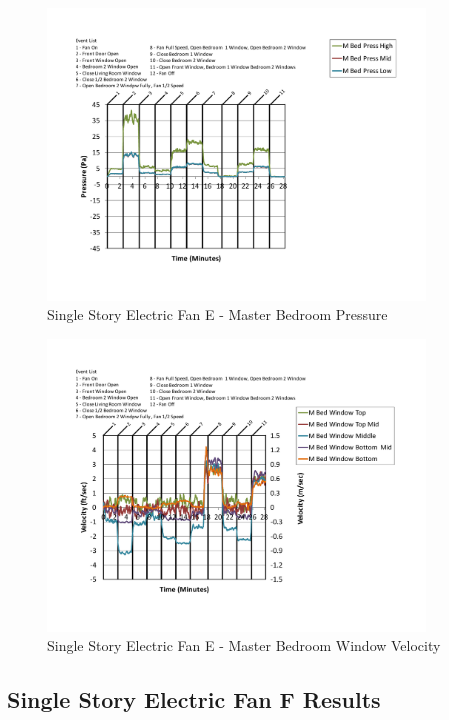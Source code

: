 \documentclass{article}
\begin{document}
\begin{appendices}
	\begin{figure}[H]
		\centering
		\includegraphics[height=3.05in,trim=0.67in 1.1in 0.67in 0.8in,clip=true]{0_Images/Results_Charts/ColdFlow/Single_Story/Electric/E/Master_Bedroom_Pressure.pdf}
		\caption{Single Story Electric Fan E - Master Bedroom Pressure}
	\end{figure}
 

	\begin{figure}[H]
		\centering
		\includegraphics[height=3.05in,trim=0.67in 1.1in 0.67in 0.8in,clip=true]{0_Images/Results_Charts/ColdFlow/Single_Story/Electric/E/Master_Bedroom_Window_Velocity.pdf}
		\caption{Single Story Electric Fan E - Master Bedroom Window Velocity}
	\end{figure}
 
	\clearpage

		\clearpage
\clearpage		\large
\subsection{Single Story Electric Fan F Results} \label{App:Single_StoryElectricFanFResults} 


\end{appendices}
\end{document}
